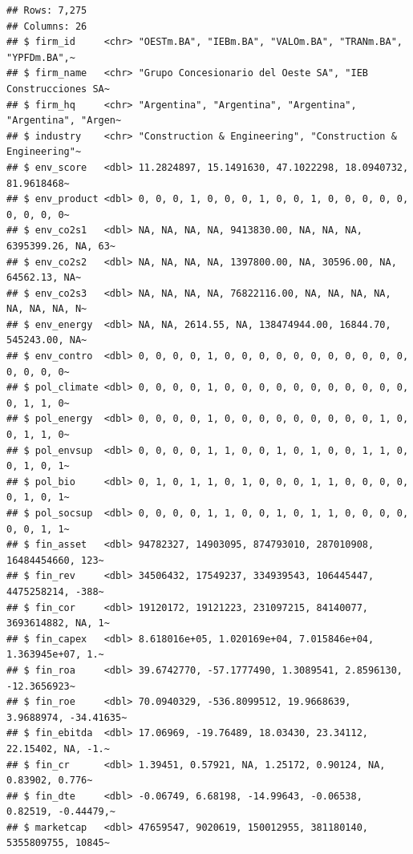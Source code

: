 \documentclass[
]{article}
\begin{document}
\begin{verbatim}
## Rows: 7,275
## Columns: 26
## $ firm_id     <chr> "OESTm.BA", "IEBm.BA", "VALOm.BA", "TRANm.BA", "YPFDm.BA",~
## $ firm_name   <chr> "Grupo Concesionario del Oeste SA", "IEB Construcciones SA~
## $ firm_hq     <chr> "Argentina", "Argentina", "Argentina", "Argentina", "Argen~
## $ industry    <chr> "Construction & Engineering", "Construction & Engineering"~
## $ env_score   <dbl> 11.2824897, 15.1491630, 47.1022298, 18.0940732, 81.9618468~
## $ env_product <dbl> 0, 0, 0, 1, 0, 0, 0, 1, 0, 0, 1, 0, 0, 0, 0, 0, 0, 0, 0, 0~
## $ env_co2s1   <dbl> NA, NA, NA, NA, 9413830.00, NA, NA, NA, 6395399.26, NA, 63~
## $ env_co2s2   <dbl> NA, NA, NA, NA, 1397800.00, NA, 30596.00, NA, 64562.13, NA~
## $ env_co2s3   <dbl> NA, NA, NA, NA, 76822116.00, NA, NA, NA, NA, NA, NA, NA, N~
## $ env_energy  <dbl> NA, NA, 2614.55, NA, 138474944.00, 16844.70, 545243.00, NA~
## $ env_contro  <dbl> 0, 0, 0, 0, 1, 0, 0, 0, 0, 0, 0, 0, 0, 0, 0, 0, 0, 0, 0, 0~
## $ pol_climate <dbl> 0, 0, 0, 0, 1, 0, 0, 0, 0, 0, 0, 0, 0, 0, 0, 0, 0, 1, 1, 0~
## $ pol_energy  <dbl> 0, 0, 0, 0, 1, 0, 0, 0, 0, 0, 0, 0, 0, 0, 1, 0, 0, 1, 1, 0~
## $ pol_envsup  <dbl> 0, 0, 0, 0, 1, 1, 0, 0, 1, 0, 1, 0, 0, 1, 1, 0, 0, 1, 0, 1~
## $ pol_bio     <dbl> 0, 1, 0, 1, 1, 0, 1, 0, 0, 0, 1, 1, 0, 0, 0, 0, 0, 1, 0, 1~
## $ pol_socsup  <dbl> 0, 0, 0, 0, 1, 1, 0, 0, 1, 0, 1, 1, 0, 0, 0, 0, 0, 0, 1, 1~
## $ fin_asset   <dbl> 94782327, 14903095, 874793010, 287010908, 16484454660, 123~
## $ fin_rev     <dbl> 34506432, 17549237, 334939543, 106445447, 4475258214, -388~
## $ fin_cor     <dbl> 19120172, 19121223, 231097215, 84140077, 3693614882, NA, 1~
## $ fin_capex   <dbl> 8.618016e+05, 1.020169e+04, 7.015846e+04, 1.363945e+07, 1.~
## $ fin_roa     <dbl> 39.6742770, -57.1777490, 1.3089541, 2.8596130, -12.3656923~
## $ fin_roe     <dbl> 70.0940329, -536.8099512, 19.9668639, 3.9688974, -34.41635~
## $ fin_ebitda  <dbl> 17.06969, -19.76489, 18.03430, 23.34112, 22.15402, NA, -1.~
## $ fin_cr      <dbl> 1.39451, 0.57921, NA, 1.25172, 0.90124, NA, 0.83902, 0.776~
## $ fin_dte     <dbl> -0.06749, 6.68198, -14.99643, -0.06538, 0.82519, -0.44479,~
## $ marketcap   <dbl> 47659547, 9020619, 150012955, 381180140, 5355809755, 10845~
\end{verbatim}

 
  \providecommand{\huxb}[2]{\arrayrulecolor[RGB]{#1}\global\arrayrulewidth=#2pt}
  \providecommand{\huxvb}[2]{\color[RGB]{#1}\vrule width #2pt}
  \providecommand{\huxtpad}[1]{\rule{0pt}{#1}}
  \providecommand{\huxbpad}[1]{\rule[-#1]{0pt}{#1}}
\end{document}
